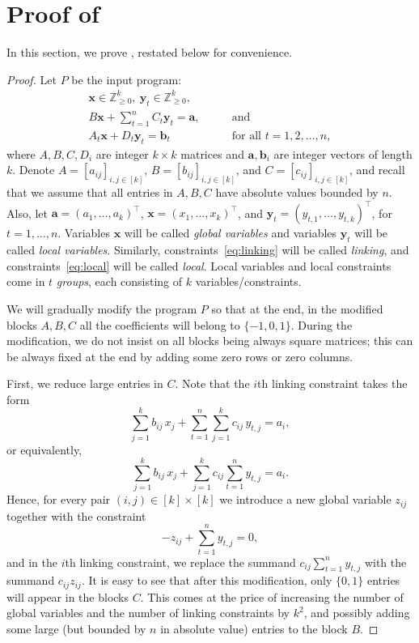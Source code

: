 \documentclass{article}
\renewcommand{\geq}{\geqslant}
\newcommand{\Z}{\mathbb{Z}}
\newcommand{\Zn}{\Z_{\geq 0}}
\newcommand{\tup}[1]{{\mathbf{#1}}}
\newcommand{\xx}{\tup x}
\newcommand{\yy}{\tup y}
\newcommand{\av}{\tup a}
\newcommand{\bb}{\tup b}
\begin{document}


\newpage
\appendix
\section{Proof of \texorpdfstring{}{Observation \ref{obs:4block}}}\label{app:4block}

In this section, we prove , restated below for convenience.

\fourblock*

\begin{proof}
    Let $P$ be the input program:
    \begin{align}
 \xx\in \Zn^k,\ \yy_t\in \Zn^k, &\nonumber\\
     B\xx+\sum_{t=1}^n C_t\yy_t = \av, & \qquad \textrm{and}\label{eq:linking} \\
 A_t\xx + D_t\yy_t =\bb_t &\qquad \textrm{for all }t=1,2,\ldots,n,\label{eq:local}
    \end{align}
    where $A,B,C,D_i$ are integer $k\times k$ matrices and $\av,\bb_i$ are integer vectors of length $k$. Denote $A=[a_{ij}]_{i,j\in [k]}$, $B=[b_{ij}]_{i,j\in [k]}$, and $C=[c_{ij}]_{i,j\in [k]}$, and recall that we assume that all entries in $A,B,C$ have absolute values bounded by $n$. Also, let $\av=(a_1,\ldots,a_k)^\intercal$, $\xx=(x_1,\ldots,x_k)^\intercal$, and $\yy_t=(y_{t,1},\ldots,y_{t,k})^\intercal$, for $t=1,\ldots,n$. Variables $\xx$ will be called {\em{global variables}} and variables $\yy_t$ will be called {\em{local variables}}. Similarly, constraints~\eqref{eq:linking} will be called {\em{linking}}, and constraints~\eqref{eq:local} will be called {\em{local}}. Local variables and local constraints come in $t$ {\em{groups}}, each consisting of $k$ variables/constraints.

    We will gradually modify the program $P$ so that at the end, in the modified blocks $A,B,C$ all the coefficients will belong to $\{-1,0,1\}$. During the modification, we do not insist on all blocks being always square matrices; this can be always fixed at the end by adding some zero rows or zero columns.

    First, we reduce large entries in $C$. Note that the $i$th linking constraint takes the form
    $$\sum_{j=1}^k b_{ij}\,x_j + \sum_{t=1}^n \sum_{j=1}^k c_{ij}\,y_{t,j}= a_i,$$
    or equivalently,
    $$\sum_{j=1}^k b_{ij}\,x_j + \sum_{j=1}^k c_{ij}\sum_{t=1}^n  y_{t,j}= a_i.$$
    Hence, for every pair $(i,j)\in [k]\times [k]$ we introduce a new global variable $z_{ij}$ together with the constraint
    $$-z_{ij}+\sum_{t=1}^n y_{t,j}=0,$$
    and in the $i$th linking constraint, we replace the summand $c_{ij}\sum_{t=1}^n  y_{t,j}$ with the summand $c_{ij}z_{ij}$. It is easy to see that after this modification, only $\{0,1\}$ entries will appear in the blocks $C$. This comes at the price of increasing the number of global variables and the number of linking constraints by $k^2$, and possibly adding some large (but bounded by $n$ in absolute value) entries to the block $B$.


\end{proof}
\end{document}
